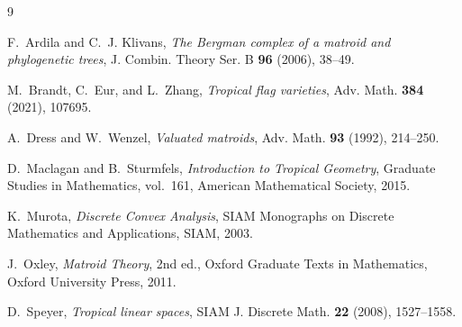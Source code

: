 \documentclass[12pt]{article}
\theoremstyle{plain}
\theoremstyle{definition}
\begin{document}
\begin{thebibliography}{9}

F.~Ardila and C.~J. Klivans,
\emph{The Bergman complex of a matroid and phylogenetic trees},
J. Combin. Theory Ser. B \textbf{96} (2006), 38--49.

M.~Brandt, C.~Eur, and L.~Zhang,
\emph{Tropical flag varieties},
Adv. Math. \textbf{384} (2021), 107695.

A.~Dress and W.~Wenzel,
\emph{Valuated matroids},
Adv. Math. \textbf{93} (1992), 214--250.

D.~Maclagan and B.~Sturmfels,
\emph{Introduction to Tropical Geometry},
Graduate Studies in Mathematics, vol.~161,
American Mathematical Society, 2015.

K.~Murota,
\emph{Discrete Convex Analysis},
SIAM Monographs on Discrete Mathematics and Applications,
SIAM, 2003.

J.~Oxley,
\emph{Matroid Theory},
2nd ed.,
Oxford Graduate Texts in Mathematics,
Oxford University Press, 2011.

D.~Speyer,
\emph{Tropical linear spaces},
SIAM J. Discrete Math. \textbf{22} (2008), 1527--1558.

\end{thebibliography}
\end{document}
